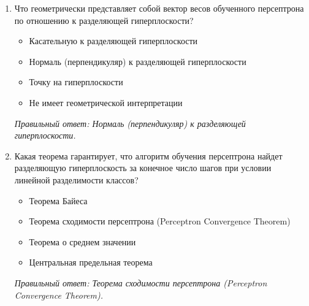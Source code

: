 \begin{enumerate}[label=\textbf{\arabic*.}, leftmargin=0pt, itemsep=1.2em]
\item Что геометрически представляет собой вектор весов обученного персептрона по отношению к разделяющей гиперплоскости?
\begin{itemize}[label=$\square$, leftmargin=1.5cm, itemsep=0.2em, topsep=0.3em]
\item Касательную к разделяющей гиперплоскости
\item Нормаль (перпендикуляр) к разделяющей гиперплоскости
\item Точку на гиперплоскости
\item Не имеет геометрической интерпретации
\end{itemize}
{\small\textit{Правильный ответ: Нормаль (перпендикуляр) к разделяющей гиперплоскости.}}

\item Какая теорема гарантирует, что алгоритм обучения персептрона найдет разделяющую гиперплоскость за конечное число шагов при условии линейной разделимости классов?
\begin{itemize}[label=$\square$, leftmargin=1.5cm, itemsep=0.2em, topsep=0.3em]
\item Теорема Байеса
\item Теорема сходимости персептрона (Perceptron Convergence Theorem)
\item Теорема о среднем значении
\item Центральная предельная теорема
\end{itemize}
{\small\textit{Правильный ответ: Теорема сходимости персептрона (Perceptron Convergence Theorem).}}

\end{enumerate}
